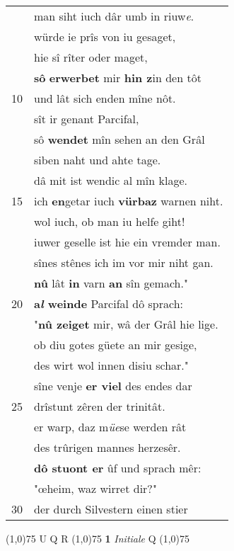 \documentclass[8pt,a4paper,notitlepage]{article}
\begin{document}
\begin{table}[ht]
\begin{minipage}[t]{0.5\linewidth}
\begin{tabular}{rl}
 & man siht iuch dâr umb in riuw\textit{e}.\\ 
 & würde ie prîs von iu gesaget,\\ 
 & hie sî rîter oder maget,\\ 
 & \textbf{sô} \textbf{erwerbet} mir \textbf{hin z}in den tôt\\ 
10 & und lât sich enden mîne nôt.\\ 
 & sît ir genant Parcifal,\\ 
 & sô \textbf{wendet} mîn sehen an den Grâl\\ 
 & siben naht und ahte tage.\\ 
 & dâ mit ist wendic al mîn klage.\\ 
15 & ich \textbf{en}getar iuch \textbf{vürbaz} warnen niht.\\ 
 & wol iuch, ob man iu helfe giht!\\ 
 & iuwer geselle ist hie ein vremder man.\\ 
 & sînes stênes ich im vor mir niht gan.\\ 
 & \textbf{nû} lât \textbf{in} varn \textbf{an} sîn gemach."\\ 
20 & \textbf{a\textit{l} weinde} Parcifal dô sprach:\\ 
 & "\textbf{nû zeiget} mir, wâ der Grâl hie lige.\\ 
 & ob diu gotes güete an mir gesige,\\ 
 & des wirt wol innen disiu schar."\\ 
 & sîne venje \textbf{er viel} des endes dar\\ 
25 & drîstunt zêren der trinitât.\\ 
 & er warp, daz m\textit{üe}se werden rât\\ 
 & des trûrigen mannes herzesêr.\\ 
 & \textbf{dô stuont er} ûf und sprach mêr:\\ 
 & "œheim, waz wirret dir?"\\ 
30 & der durch Silvestern einen stier\\ 
\end{tabular}
\scriptsize
\line(1,0){75} \newline
U Q R \newline
\line(1,0){75} \newline
\textbf{1} \textit{Initiale} Q  \newline
\line(1,0){75} \newline

\end{minipage}
\end{table}
\end{document}
